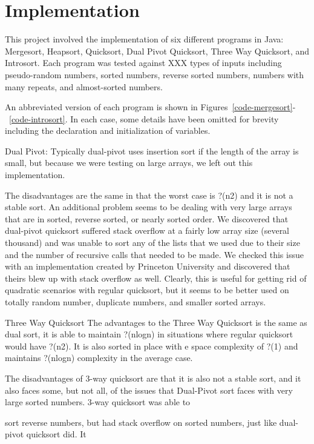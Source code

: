 \documentclass{article}
\begin{document}
\section{Implementation}
This project involved the implementation of six different programs in Java: Mergesort,
Heapsort, Quicksort, Dual Pivot Quicksort, Three Way Quicksort, and Introsort. Each
program was tested against XXX types of inputs including pseudo-random numbers,
sorted numbers, reverse sorted numbers, numbers with many repeats, and almost-sorted
numbers.

An abbreviated version of each program is shown in Figures~\ref{code-mergesort}-
~\ref{code-introsort}. In each case, some details have been omitted for brevity including
the declaration and initialization of variables.

Dual Pivot:
Typically dual-pivot uses insertion sort if 
the length of the array is small, but because we were testing on large arrays, we left out this 
implementation. 

The disadvantages are the same in that the worst case is ?(n2) and it is not a stable sort. An 
additional problem seems to be dealing with very large arrays that are in sorted, reverse sorted, or 
nearly sorted order. We discovered that dual-pivot quicksort suffered stack overflow at a fairly low 
array size (several thousand) and was unable to sort any of the lists that we used due to their size 
and the number of recursive calls that needed to be made.  We checked this issue with an 
implementation created by Princeton University and discovered that theirs blew up with stack 
overflow as well. Clearly, this is useful for getting rid of quadratic scenarios with regular quicksort, 
but it seems to be better used on totally random number, duplicate numbers, and smaller sorted 
arrays.

Three Way Quicksort
The advantages to the Three Way Quicksort is the same as dual sort, it is able to maintain 
?(nlogn) in situations where regular quicksort would have ?(n2). It is also sorted in place with e space 
complexity of ?(1) and maintains ?(nlogn) complexity in the average case.

The disadvantages of 3-way quicksort are that it is also not a stable sort, and it also faces some, but not
all, of the issues that Dual-Pivot sort faces with very large sorted numbers. 3-way quicksort was able to 

sort reverse numbers, but had stack overflow on sorted numbers, just like dual-pivot quicksort did. It 
\end{document}
